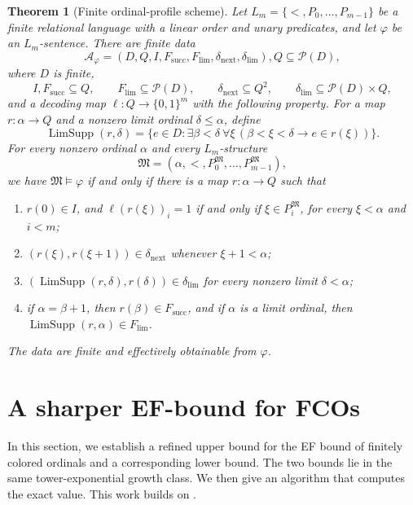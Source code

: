 \documentclass{amsart}
\newtheorem{theorem}{Theorem}
\theoremstyle{definition}
\begin{document}
\begin{theorem}[Finite ordinal-profile scheme]
\label{lem:finite-profile-scheme}
Let
$
  L_m=\{<,P_0,\ldots,P_{m-1}\}$
be a finite relational language with a linear order and unary predicates,
and let $\varphi$ be an $L_m$-sentence.  There are finite data
\[
 \mathcal A_\varphi=(D,Q,I,F_{\mathrm{succ}},F_{\mathrm{lim}},
                      \delta_{\mathrm{next}},\delta_{\mathrm{lim}}),
  Q\subseteq\mathcal P(D),
\]
where $D$ is finite,
\[
 I,F_{\mathrm{succ}}\subseteq Q,\qquad
 F_{\mathrm{lim}}\subseteq\mathcal P(D),\qquad
 \delta_{\mathrm{next}}\subseteq Q^2,\qquad
 \delta_{\mathrm{lim}}\subseteq\mathcal P(D)\times Q,
\]
and a decoding map $\ell:Q\to\{0,1\}^{m}$ with the following property.
For a map $r:\alpha\to Q$ and a nonzero limit ordinal
$\delta\leq\alpha$, define
\[
 \operatorname{LimSupp}(r,\delta)=
 \{e\in D:\exists\beta<\delta\ \forall\xi\,
       (\beta<\xi<\delta\longrightarrow e\in r(\xi))\}.
\]
For every nonzero ordinal $\alpha$ and every $L_m$-structure
\[
 \mathfrak M=(\alpha,<,P_0^{\mathfrak M},\ldots,
                         P_{m-1}^{\mathfrak M}),
\]
we have $\mathfrak M\models\varphi$ if and only if there is a map
$r:\alpha\to Q$ such that
\begin{enumerate}
  \item $r(0)\in I$, and
  $\ell(r(\xi))_i=1$ if and only if
  $\xi\in P_i^{\mathfrak M}$, for every $\xi<\alpha$ and $i<m$;
  \item $(r(\xi),r(\xi+1))\in\delta_{\mathrm{next}}$ whenever
  $\xi+1<\alpha$;
  \item $(\operatorname{LimSupp}(r,\delta),r(\delta))\in
  \delta_{\mathrm{lim}}$ for every nonzero limit
  $\delta<\alpha$;
  \item if $\alpha=\beta+1$, then $r(\beta)\in F_{\mathrm{succ}}$,
  and if $\alpha$ is a limit ordinal, then
  $\operatorname{LimSupp}(r,\alpha)\in F_{\mathrm{lim}}$.
\end{enumerate}
The data are finite and effectively obtainable from $\varphi$.
\end{theorem}


\section{A sharper EF-bound for FCOs}\label{sec:EFbound}

In this section, we establish a refined upper bound for the EF bound of finitely colored ordinals and a corresponding lower bound. The two bounds lie in the same tower-exponential growth class. We then give an algorithm that computes the exact value. This work builds on \cite{Mwesigye2011,Mwesigye2018}.
\end{document}
